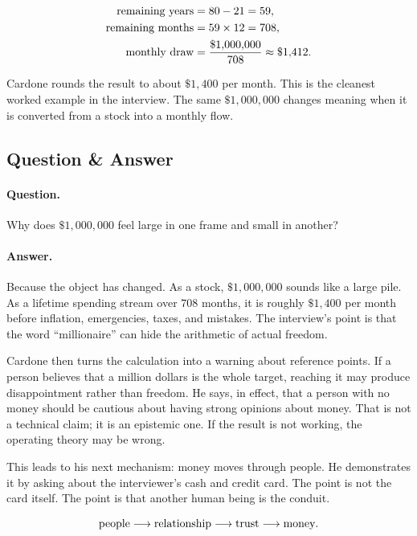 \begin{align}
\hbox{remaining years} &= 80-21=59,\\
\hbox{remaining months} &= 59\times 12=708,\\
\hbox{monthly draw} &=
\frac{\$1{,}000{,}000}{708}
\approx \$1{,}412.
\end{align}

Cardone rounds the result to about \(\$1{,}400\) per month. This is the cleanest worked example in the interview. The same \(\$1{,}000{,}000\) changes meaning when it is converted from a stock into a monthly flow.

\subsection{Question \& Answer}

\paragraph{Question.} Why does \(\$1{,}000{,}000\) feel large in one frame and small in another?

\paragraph{Answer.} Because the object has changed. As a stock, \(\$1{,}000{,}000\) sounds like a large pile. As a lifetime spending stream over \(708\) months, it is roughly \(\$1{,}400\) per month before inflation, emergencies, taxes, and mistakes. The interview's point is that the word ``millionaire'' can hide the arithmetic of actual freedom.

Cardone then turns the calculation into a warning about reference points. If a person believes that a million dollars is the whole target, reaching it may produce disappointment rather than freedom. He says, in effect, that a person with no money should be cautious about having strong opinions about money. That is not a technical claim; it is an epistemic one. If the result is not working, the operating theory may be wrong.

This leads to his next mechanism: money moves through people. He demonstrates it by asking about the interviewer's cash and credit card. The point is not the card itself. The point is that another human being is the conduit.

\[
\hbox{people}
\longrightarrow
\hbox{relationship}
\longrightarrow
\hbox{trust}
\longrightarrow
\hbox{money}.
\]

